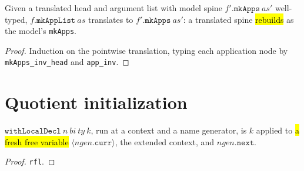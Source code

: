 \begin{lemma}
\label{thm:tr-expr-mk-app-list}
\leanok
{}

 Given a translated head and argument list with model spine
$f'.\mathtt{mkApps}\ as'$ well-typed, $f.\mathtt{mkAppList}\ as$ translates to
$f'.\mathtt{mkApps}\ as'$: a translated spine \hl{rebuilds} as the model's
\texttt{mkApps}.
\end{lemma}
\begin{proof}
\leanok
{} Induction on the pointwise translation, typing each application node by
\texttt{mkApps\_inv\_head} and \texttt{app\_inv}.
\end{proof}

\section{Quotient initialization}

\begin{lemma}
\label{thm:with-local-decl-run}
\leanok
{}

 $\mathtt{withLocalDecl}\ n\ bi\ ty\ k$, run at a context and a name
generator, is $k$ applied to \hl{a fresh free variable}
$\langle ngen.\mathtt{curr}\rangle$, the extended context, and $ngen.\mathtt{next}$.
\end{lemma}
\begin{proof}
\leanok
{} \texttt{rfl}.
\end{proof}

